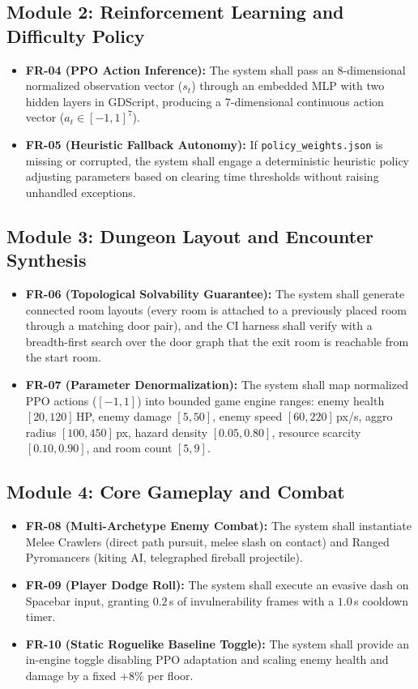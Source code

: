 \subsection{Module 2: Reinforcement Learning and Difficulty Policy}
\begin{itemize}
    \item \textbf{FR-04 (PPO Action Inference):} The system shall pass an 8-dimensional normalized observation vector ($s_t$) through an embedded MLP with two hidden layers in GDScript, producing a 7-dimensional continuous action vector ($a_t \in [-1, 1]^7$).
    \item \textbf{FR-05 (Heuristic Fallback Autonomy):} If \texttt{policy\_weights.json} is missing or corrupted, the system shall engage a deterministic heuristic policy adjusting parameters based on clearing time thresholds without raising unhandled exceptions.
\end{itemize}

\subsection{Module 3: Dungeon Layout and Encounter Synthesis}
\begin{itemize}
    \item \textbf{FR-06 (Topological Solvability Guarantee):} The system shall generate connected room layouts (every room is attached to a previously placed room through a matching door pair), and the CI harness shall verify with a breadth-first search over the door graph that the exit room is reachable from the start room.
    \item \textbf{FR-07 (Parameter Denormalization):} The system shall map normalized PPO actions ($[-1, 1]$) into bounded game engine ranges: enemy health $[20, 120]$\,HP, enemy damage $[5, 50]$, enemy speed $[60, 220]$\,px/s, aggro radius $[100, 450]$\,px, hazard density $[0.05, 0.80]$, resource scarcity $[0.10, 0.90]$, and room count $[5, 9]$.
\end{itemize}

\subsection{Module 4: Core Gameplay and Combat}
\begin{itemize}
    \item \textbf{FR-08 (Multi-Archetype Enemy Combat):} The system shall instantiate Melee Crawlers (direct path pursuit, melee slash on contact) and Ranged Pyromancers (kiting AI, telegraphed fireball projectile).
    \item \textbf{FR-09 (Player Dodge Roll):} The system shall execute an evasive dash on Spacebar input, granting $0.2$\,s of invulnerability frames with a $1.0$\,s cooldown timer.
    \item \textbf{FR-10 (Static Roguelike Baseline Toggle):} The system shall provide an in-engine toggle disabling PPO adaptation and scaling enemy health and damage by a fixed $+8\%$ per floor.
\end{itemize}

